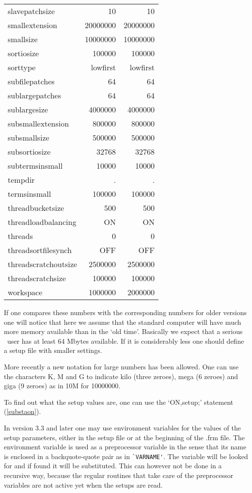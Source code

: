 \begin{center}
\begin{tabular}{lrr}
slavepatchsize &        10            & 10 \\
smallextension &        20000000      & 20000000 \\
smallsize &             10000000      & 10000000 \\
sortiosize &            100000        & 100000 \\
sorttype &              lowfirst      & lowfirst \\
subfilepatches &        64            & 64 \\
sublargepatches &       64            & 64 \\
sublargesize &          4000000       & 4000000 \\
subsmallextension &     800000        & 800000 \\
subsmallsize &          500000        & 500000 \\
subsortiosize &         32768         & 32768 \\
subtermsinsmall &       10000         & 10000 \\
tempdir &               .             & . \\
termsinsmall &          100000        & 100000 \\
threadbucketsize &      500           & 500 \\
threadloadbalancing &   ON            & ON \\
threads &               0             & 0 \\
threadsortfilesynch &   OFF           & OFF \\
threadscratchoutsize &  2500000       & 2500000 \\
threadscratchsize &     100000        & 100000 \\
workspace &             1000000       & 2000000
\end{tabular}
\end{center}
If one compares these numbers with the corresponding numbers for older 
versions one will notice that here we assume that the standard computer 
will have much more memory available than in the `old time'. Basically we 
expect that a serious \FORM\ user has at least 64 Mbytes available. If it is 
considerably less one should define a setup file with smaller settings.

More recently a new notation for large numbers has been allowed. One can 
use the characters K, M and G to indicate kilo (three zeroes), mega (6 
zeroes) and giga (9 zeroes) as in 10M for 10000000.

To find out what the setup values are, one can use the `ON,setup;' 
statement (\ref{substaon}).

In version 3.3 and later one may use environment 
variables for the values of the setup parameters, either in the setup file 
or at the beginning of the .frm file. The environment variable is used as a 
preprocessor variable in the sense that its name is enclosed in a 
backquote-quote pair as in \verb:`VARNAME':. The variable will be looked 
for and if found it will be substituted. This can however not be done in a 
recursive way, because the regular routines that take care of the 
preprocessor variables are not active yet when the setups are read.
